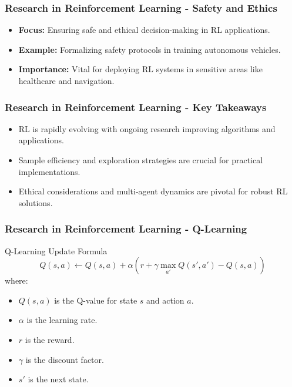 \documentclass[aspectratio=169]{beamer}
\begin{document}
\begin{frame}[fragile]
    \frametitle{Research in Reinforcement Learning - Safety and Ethics}
    \begin{itemize}
        \item \textbf{Focus:} Ensuring safe and ethical decision-making in RL applications.
        \item \textbf{Example:} Formalizing safety protocols in training autonomous vehicles.
        \item \textbf{Importance:} Vital for deploying RL systems in sensitive areas like healthcare and navigation.
    \end{itemize}
\end{frame}

\begin{frame}[fragile]
    \frametitle{Research in Reinforcement Learning - Key Takeaways}
    \begin{itemize}
        \item RL is rapidly evolving with ongoing research improving algorithms and applications.
        \item Sample efficiency and exploration strategies are crucial for practical implementations.
        \item Ethical considerations and multi-agent dynamics are pivotal for robust RL solutions.
    \end{itemize}
\end{frame}

\begin{frame}[fragile]
    \frametitle{Research in Reinforcement Learning - Q-Learning}
    \begin{block}{Q-Learning Update Formula}
        \begin{equation}
            Q(s, a) \leftarrow Q(s, a) + \alpha \left( r + \gamma \max_{a'} Q(s', a') - Q(s, a) \right)
        \end{equation}
        where:
        \begin{itemize}
            \item \( Q(s, a) \) is the Q-value for state \( s \) and action \( a \).
            \item \(\alpha\) is the learning rate.
            \item \( r \) is the reward.
            \item \( \gamma \) is the discount factor.
            \item \( s' \) is the next state.
        \end{itemize}
    \end{block}
\end{frame}
\end{document}

